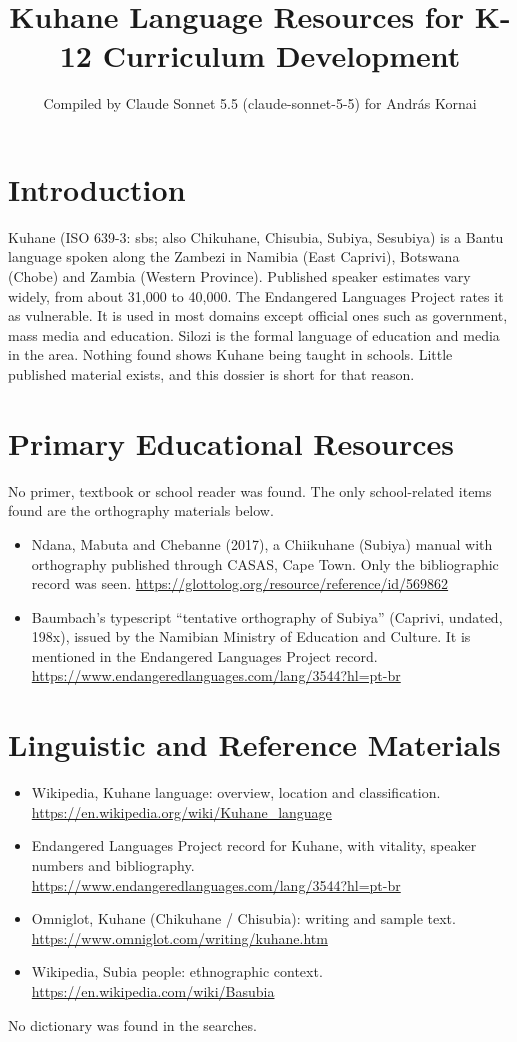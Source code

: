\documentclass[12pt]{article}
\title{Kuhane Language Resources for K-12 Curriculum Development}
\author{Compiled by Claude Sonnet 5.5 (claude-sonnet-5-5) for Andr\'as Kornai}
\date{}
\begin{document}
\maketitle

\section{Introduction}
Kuhane (ISO 639-3: sbs; also Chikuhane, Chisubia, Subiya, Sesubiya) is a Bantu language spoken along the Zambezi in Namibia (East Caprivi), Botswana (Chobe) and Zambia (Western Province). Published speaker estimates vary widely, from about 31,000 to 40,000. The Endangered Languages Project rates it as vulnerable. It is used in most domains except official ones such as government, mass media and education. Silozi is the formal language of education and media in the area. Nothing found shows Kuhane being taught in schools. Little published material exists, and this dossier is short for that reason.

\section{Primary Educational Resources}
No primer, textbook or school reader was found. The only school-related items found are the orthography materials below.
\begin{itemize}
\item Ndana, Mabuta and Chebanne (2017), a Chiikuhane (Subiya) manual with orthography published through CASAS, Cape Town. Only the bibliographic record was seen. \url{https://glottolog.org/resource/reference/id/569862}
\item Baumbach's typescript ``tentative orthography of Subiya'' (Caprivi, undated, 198x), issued by the Namibian Ministry of Education and Culture. It is mentioned in the Endangered Languages Project record. \url{https://www.endangeredlanguages.com/lang/3544?hl=pt-br}
\end{itemize}

\section{Linguistic and Reference Materials}
\begin{itemize}
\item Wikipedia, Kuhane language: overview, location and classification. \url{https://en.wikipedia.org/wiki/Kuhane_language}
\item Endangered Languages Project record for Kuhane, with vitality, speaker numbers and bibliography. \url{https://www.endangeredlanguages.com/lang/3544?hl=pt-br}
\item Omniglot, Kuhane (Chikuhane / Chisubia): writing and sample text. \url{https://www.omniglot.com/writing/kuhane.htm}
\item Wikipedia, Subia people: ethnographic context. \url{https://en.wikipedia.com/wiki/Basubia}
\end{itemize}
No dictionary was found in the searches.
\end{document}
